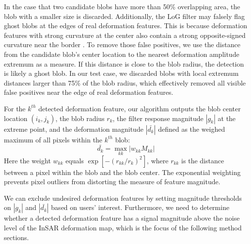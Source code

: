 In the case that two candidate blobs have more than 50\% overlapping area, the blob with a smaller size is discarded. 
Additionally, the LoG filter may falsely flag ghost blobs at the edges of real deformation features. This is because deformation features with strong curvature at the center also contain a strong opposite-signed curvature near the border \cite{Lindeberg1998FeatureDetectionAutomatic}. To remove those false positives, we use the distance from the candidate blob's center location to the nearest deformation amplitude extremum as a measure. If this distance is close to the blob radius, the detection is likely a ghost blob. In our test case, we discarded blobs with local extremum distances larger than 75$\%$ of the blob radius, which effectively removed all visible false positives near the edge of real deformation features.

For the $k^{th}$ detected deformation feature, our algorithm outputs the blob center location $(i_k, j_k)$, the blob radius $ r_k$, the filter response magnitude $|g_k|$ at the extreme point, and the deformation magnitude $|\bar{d_k}|$ defined as the weighed maximum of all pixels within the $k^{th}$ blob:
\begin{equation}
	\bar{d_k} = \max_{kk} |w_{kk} M_{kk} | 
\end{equation}
Here the weight $w_{kk}$ equals $\exp\left[-(r_{kk} / r_k)^2\right]$, where $r_{kk}$ is the distance between a pixel within the blob and the blob center. The exponential weighting prevents pixel outliers from distorting the measure of feature magnitude. 

We can exclude undesired deformation features by setting magnitude thresholds on $|g_k|$ and $|\bar{d_k}|$ based on users' interest. Furthermore, we need to determine whether a detected deformation feature has a signal magnitude above the noise level of the InSAR deformation map, which is the focus of the following method sections. 


